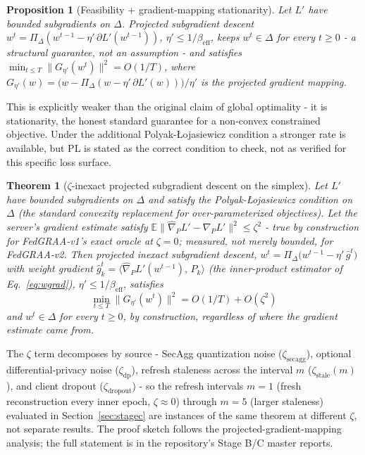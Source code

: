 \documentclass[11pt,a4paper]{report}
\newtheorem{theorem}{Theorem}[chapter]
\newtheorem{proposition}{Proposition}[chapter]
\newcommand{\simplex}{\Delta}
\newcommand{\proj}{\Pi_{\simplex}}
\newcommand{\Lprime}{L'}
\begin{document}
\begin{proposition}[Feasibility + gradient-mapping stationarity]
\label{prop:stageb}
Let $\Lprime$ have bounded subgradients on $\simplex$. Projected subgradient
descent $w^t=\proj(w^{t-1}-\eta'\,\partial\Lprime(w^{t-1}))$,
$\eta'\le1/\beta_{\mathrm{eff}}$, keeps $w^t\in\simplex$ for every $t\ge0$ -
a structural guarantee, not an assumption - and satisfies
$\min_{t\le T}\|G_{\eta'}(w^t)\|^2 = O(1/T)$, where
$G_{\eta'}(w)=\bigl(w-\proj(w-\eta'\,\partial\Lprime(w))\bigr)/\eta'$ is the
projected gradient mapping.
\end{proposition}

This is explicitly weaker than the original claim of global optimality - it
is stationarity, the honest standard guarantee for a non-convex constrained
objective. Under the additional Polyak-{\L}ojasiewicz condition
\cite{karimi2016pl} a stronger rate is available, but PL is stated as the
correct condition to check, not as verified for this specific loss surface.

\begin{theorem}[$\zeta$-inexact projected subgradient descent on the simplex]
\label{thm:zeta-inexact}
Let $\Lprime$ have bounded subgradients on $\simplex$ and satisfy the
Polyak-{\L}ojasiewicz condition on $\simplex$ (the standard convexity
replacement for over-parameterized objectives). Let the server's gradient
estimate satisfy
$\mathbb{E}\|\hat\nabla_P\Lprime-\nabla_P\Lprime\|^2\le\zeta^2$
- true by construction for FedGRAA-v1's exact oracle at $\zeta=0$; measured,
not merely bounded, for FedGRAA-v2. Then projected inexact subgradient
descent, $w^t=\proj\bigl(w^{t-1}-\eta'\,\hat g^t\bigr)$ with weight gradient
$\hat g^t_k=\langle\hat\nabla_P\Lprime(w^{t-1}),\,P_k\rangle$ (the
inner-product estimator of Eq.~\eqref{eq:wgrad}),
$\eta'\le1/\beta_{\mathrm{eff}}$, satisfies
\begin{equation}
\min_{t\le T}\|G_{\eta'}(w^t)\|^2 = O(1/T) + O(\zeta^2)
\label{eq:convergence}
\end{equation}
and $w^t\in\simplex$ for every $t\ge0$, by construction, regardless of where
the gradient estimate came from.
\end{theorem}

The $\zeta$ term decomposes by source - SecAgg quantization noise
($\zeta_{\mathrm{secagg}}$), optional differential-privacy noise
($\zeta_{\mathrm{dp}}$), refresh staleness across the interval $m$
($\zeta_{\mathrm{stale}}(m)$), and client dropout
($\zeta_{\mathrm{dropout}}$) - so the refresh intervals $m=1$ (fresh
reconstruction every inner epoch, $\zeta\approx0$) through $m=5$ (larger
staleness) evaluated in Section~\ref{sec:stagec} are instances of the same
theorem at different $\zeta$, not separate results. The proof sketch follows
the projected-gradient-mapping analysis; the full statement is in the
repository's Stage B/C master reports.
\end{document}
